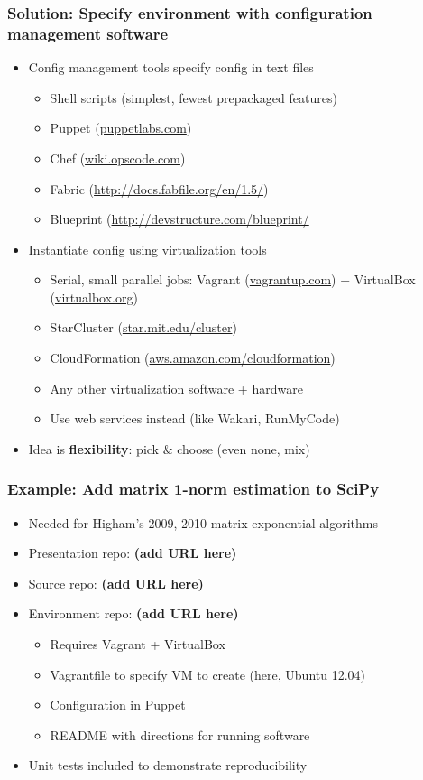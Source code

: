 \documentclass [14pt]{beamer}
\begin{document}
\begin{frame}
\frametitle{Solution: Specify environment with configuration management software}
\begin{itemize}
\item Config management tools specify config in text
  files
\begin{itemize}
\item Shell scripts (simplest, fewest prepackaged features)
\item Puppet (\url{puppetlabs.com})
\item Chef (\url{wiki.opscode.com})
\item Fabric (\url{http://docs.fabfile.org/en/1.5/})
\item Blueprint (\url{http://devstructure.com/blueprint/}
\end{itemize}
\item Instantiate config using virtualization tools
\begin{itemize}
\item Serial, small parallel jobs: Vagrant (\url{vagrantup.com}) + VirtualBox
  (\url{virtualbox.org})
\item StarCluster (\url{star.mit.edu/cluster})
\item CloudFormation (\url{aws.amazon.com/cloudformation})
\item Any other virtualization software + hardware
\item Use web services instead (like Wakari, RunMyCode)
\end{itemize}
\item Idea is \textbf{flexibility}: pick \& choose (even none, mix)
\end{itemize}
\end{frame}

\begin{frame}
\frametitle{Example: Add matrix 1-norm estimation to SciPy}
\begin{itemize}
\item Needed for Higham's 2009, 2010 matrix exponential algorithms
\item Presentation repo: \textbf{(add URL here)}
\item Source repo: \textbf{(add URL here)}
\item Environment repo: \textbf{(add URL here)}
\begin{itemize}
\item Requires Vagrant + VirtualBox
\item Vagrantfile to specify VM to create (here, Ubuntu 12.04)
\item Configuration in Puppet
\item README with directions for running software
\end{itemize}
\item Unit tests included to demonstrate reproducibility
\end{itemize}
\end{frame}
\end{document}
